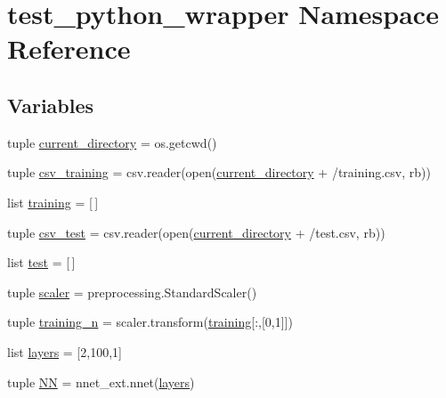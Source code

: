 \hypertarget{namespacetest__python__wrapper}{}\section{test\+\_\+python\+\_\+wrapper Namespace Reference}
\label{namespacetest__python__wrapper}
\subsection*{Variables}
\begin{DoxyCompactItemize}
\item 
tuple \hyperlink{namespacetest__python__wrapper_a59fd1bc3247bb0acb40d8cbf871143b9}{current\+\_\+directory} = os.\+getcwd()
\item 
tuple \hyperlink{namespacetest__python__wrapper_ac5d9b5723c691a9af92807d96792235a}{csv\+\_\+training} = csv.\+reader(open(\hyperlink{namespacetest__python__wrapper_a59fd1bc3247bb0acb40d8cbf871143b9}{current\+\_\+directory} + \textquotesingle{}/training.\+csv\textquotesingle{}, \textquotesingle{}rb\textquotesingle{}))
\item 
list \hyperlink{namespacetest__python__wrapper_aad910dc42f09fd045947a044950c9472}{training} = \mbox{[}$\,$\mbox{]}
\item 
tuple \hyperlink{namespacetest__python__wrapper_ae20ea0207ae3cf3032591f41c625031b}{csv\+\_\+test} = csv.\+reader(open(\hyperlink{namespacetest__python__wrapper_a59fd1bc3247bb0acb40d8cbf871143b9}{current\+\_\+directory} + \textquotesingle{}/test.\+csv\textquotesingle{}, \textquotesingle{}rb\textquotesingle{}))
\item 
list \hyperlink{namespacetest__python__wrapper_a6798c3c4cb1b40d7adaadffe659baf9b}{test} = \mbox{[}$\,$\mbox{]}
\item 
tuple \hyperlink{namespacetest__python__wrapper_a6b08d7d6b53d7c57e8a63155abb4b511}{scaler} = preprocessing.\+Standard\+Scaler()
\item 
tuple \hyperlink{namespacetest__python__wrapper_a077c5501e386c551a0c0f77f9714773d}{training\+\_\+n} = scaler.\+transform(\hyperlink{namespacetest__python__wrapper_aad910dc42f09fd045947a044950c9472}{training}\mbox{[}\+:,\mbox{[}0,1\mbox{]}\mbox{]})
\item 
list \hyperlink{namespacetest__python__wrapper_ac2c345805c1880bb41413973e3f408d6}{layers} = \mbox{[}2,100,1\mbox{]}
\item 
tuple \hyperlink{namespacetest__python__wrapper_acb732ba56f064d73826626b1ebc7db4c}{N\+N} = nnet\+\_\+ext.\+nnet(\hyperlink{namespacetest__python__wrapper_ac2c345805c1880bb41413973e3f408d6}{layers})

\end{DoxyCompactItemize}
